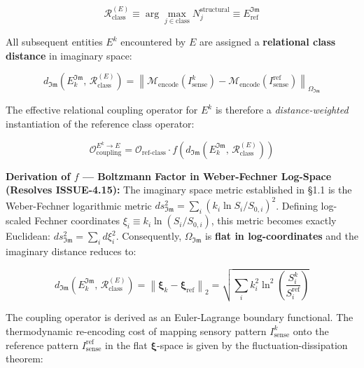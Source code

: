 \documentclass[11pt,a4paper]{article}
\theoremstyle{definition}
\theoremstyle{remark}
\begin{document}
\begin{equation}
\boxed{\mathcal{R}_{\text{class}}^{(E)} \equiv \arg\max_{j \in \text{class}} N_j^{\text{structural}} \equiv E_{\text{ref}}^{\mathfrak{Im}}}
\end{equation}


All subsequent entities $E^k$ encountered by $E$ are assigned a \textbf{relational class distance} in imaginary space:


\begin{equation}
d_{\mathfrak{Im}}\!\left(E_k^{\mathfrak{Im}},\, \mathcal{R}_{\text{class}}^{(E)}\right) = \left\| \mathcal{M}_{\text{encode}}(I_{\text{sense}}^k) - \mathcal{M}_{\text{encode}}(I_{\text{sense}}^{\text{ref}}) \right\|_{\Omega_{\mathfrak{Im}}}
\end{equation}


The effective relational coupling operator for $E^k$ is therefore a \textit{distance-weighted} instantiation of the reference class operator:


\begin{equation}
\boxed{\mathcal{O}_{\text{coupling}}^{E^k \to E} = \mathcal{O}_{\text{ref-class}} \cdot f\!\left( d_{\mathfrak{Im}}\!\left(E_k^{\mathfrak{Im}},\, \mathcal{R}_{\text{class}}^{(E)}\right) \right)}
\end{equation}


\textbf{Derivation of $f$ — Boltzmann Factor in Weber-Fechner Log-Space (Resolves ISSUE-4.15):} The imaginary space metric established in \S 1.1 is the Weber-Fechner logarithmic metric $ds_{\mathfrak{Im}}^2 = \sum_i \left(k_i \ln S_i/S_{0,i}\right)^2$. Defining log-scaled Fechner coordinates $\xi_i \equiv k_i \ln(S_i/S_{0,i})$, this metric becomes exactly Euclidean: $ds_{\mathfrak{Im}}^2 = \sum_i d\xi_i^2$. Consequently, $\Omega_{\mathfrak{Im}}$ is \textbf{flat in log-coordinates} and the imaginary distance reduces to:


\begin{equation}
d_{\mathfrak{Im}}\!\left(E_k^{\mathfrak{Im}},\, \mathcal{R}_{\text{class}}^{(E)}\right) = \left\| \boldsymbol{\xi}_k - \boldsymbol{\xi}_{\text{ref}} \right\|_2 = \sqrt{\sum_i k_i^2 \ln^2\!\left(\frac{S_i^k}{S_i^{\text{ref}}}\right)}
\end{equation}


The coupling operator is derived as an Euler-Lagrange boundary functional. The thermodynamic re-encoding cost of mapping sensory pattern $I_{\text{sense}}^k$ onto the reference pattern $I_{\text{sense}}^{\text{ref}}$ in the flat $\boldsymbol{\xi}$-space is given by the fluctuation-dissipation theorem:
\end{document}
